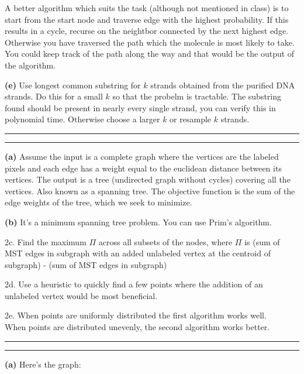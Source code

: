 \documentclass[11pt,letterpaper]{article}
\newcommand{\question}[1] {\vspace{.25in} \hrule\vspace{0.5em}
\noindent{\bf #1} \vspace{0.5em}
\hrule \vspace{.10in}}
\renewcommand{\part}[1] {\vspace{.10in} {\bf (#1)}}
\begin{document}
A better algorithm which suits the task (although not mentioned in class) is to start from the start node and traverse edge with the highest probability. If this results in a cycle, recurse on the neightbor connected by the next highest edge.
Otherwise you have traversed the path which the molecule is most likely to take. You could keep track of the path along the way and that would be the output of the algorithm.

\part{e}
Use longest common substring for $k$ strands obtained from the purified DNA strands. Do this for a small $k$ so that the probelm is tractable.
The substring found should be present in nearly every single strand, you can verify this in polynomial time. Otherwise choose a larger $k$ or resample $k$ strands.


\question{2}
\part{a}
Assume the input is a complete graph where the vertices are the labeled pixels and each edge has a weight equal to the euclidean distance between its vertices.
The output is a tree (undirected graph without cycles) covering all the vertices. Also known as a spanning tree.
The objective function is the sum of the edge weights of the tree, which we seek to minimize.

\part{b}
It's a minimum spanning tree problem. You can use Prim's algorithm.

2c.
Find the maximum $\Pi$ across all subsets of the nodes, where $\Pi$ is (sum of MST edges in subgraph with an added unlabeled vertex at the centroid of subgraph) - (sum of MST edges in subgraph)

2d.
Use a heuristic to quickly find a few points where the addition of an unlabeled vertex would be most beneficial.

2e.
When points are uniformly distributed the first algorithm works well.\\
When points are distributed unevenly, the second algorithm works better.


\question{3}
\part{a}
Here's the graph:\\
\end{document}
